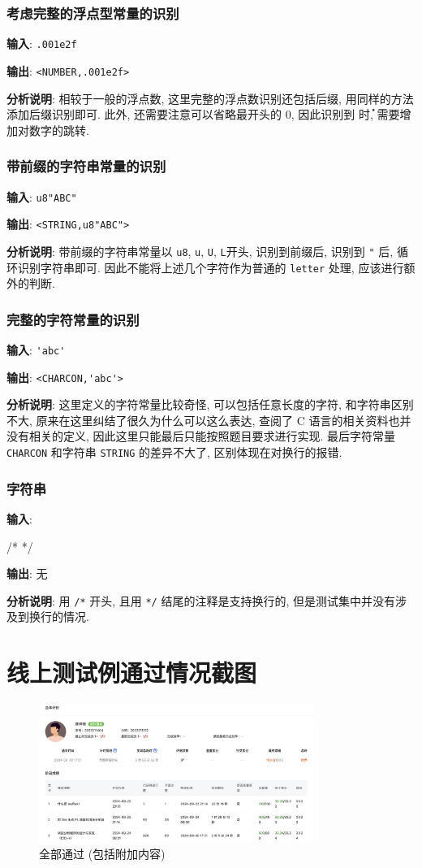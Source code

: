 \subsubsection{考虑完整的浮点型常量的识别}

\textbf{输入}: \verb|.001e2f|

\textbf{输出}: \verb|<NUMBER,.001e2f>|

\textbf{分析说明}: 相较于一般的浮点数, 这里完整的浮点数识别还包括后缀, 用同样的方法添加后缀识别即可. 此外, 还需要注意可以省略最开头的 0, 因此识别到 \. 时, 需要增加对数字的跳转.

\subsubsection{带前缀的字符串常量的识别}

\textbf{输入}: \verb|u8"ABC"|

\textbf{输出}: \verb|<STRING,u8"ABC">|

\textbf{分析说明}: 带前缀的字符串常量以 \verb|u8|, \verb|u|, \verb|U|, \verb|L|开头, 识别到前缀后, 识别到 \verb|"| 后, 循环识别字符串即可. 因此不能将上述几个字符作为普通的 \texttt{letter} 处理, 应该进行额外的判断.

\subsubsection{完整的字符常量的识别}

\textbf{输入}: \verb|'abc'|

\textbf{输出}: \verb|<CHARCON,'abc'>|

\textbf{分析说明}: 这里定义的字符常量比较奇怪, 可以包括任意长度的字符, 和字符串区别不大, 原来在这里纠结了很久为什么可以这么表达, 查阅了 C 语言的相关资料也并没有相关的定义, 因此这里只能最后只能按照题目要求进行实现. 最后字符常量 \verb|CHARCON| 和字符串 \verb|STRING| 的差异不大了, 区别体现在对换行的报错.

\subsubsection{字符串}

\textbf{输入}: \begin{cppcode}
    /*
    */
\end{cppcode}

\textbf{输出}: 无

\textbf{分析说明}: 用 \texttt{/*} 开头, 且用 \texttt{*/} 结尾的注释是支持换行的, 但是测试集中并没有涉及到换行的情况.

\section{线上测试例通过情况截图}

\begin{figure}[htbp]
    \centering
    \includegraphics[width=0.8\textwidth]{images/score.png}
    \caption{全部通过 (包括附加内容)}
\end{figure}